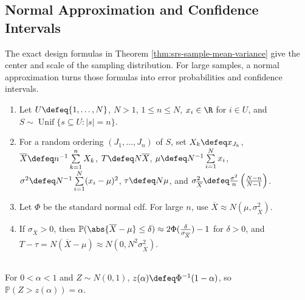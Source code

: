 \subsection{Normal Approximation and Confidence Intervals}

The exact design formulas in Theorem \ref{thm:srs-sample-mean-variance} give the center and scale of the sampling distribution.  For large samples, a normal approximation turns those formulas into error probabilities and confidence intervals.

\begin{method} \label{meth:srs-normal-approximation} 
\begin{enumerate}[label=(\roman*)]
\setlength{\itemsep}{0pt}
\item Let $U\defeq\{1,\ldots,N\}$, $N>1$, $1\leq n\leq N$, $x_i\in\R$ for $i\in U$, and $S\sim\operatorname{Unif}\{s\subseteq U:|s|=n\}$.
\item For a random ordering $(J_1,\ldots,J_n)$ of $S$, set $X_k\defeq x_{J_k}$, $\overline{X}\defeq n^{-1}\sum\limits_{k=1}^{n}X_k$, $T\defeq N\overline{X}$, $\mu\defeq N^{-1}\sum\limits_{i=1}^{N}x_i$, $\sigma^2\defeq N^{-1}\sum\limits_{i=1}^{N}(x_i-\mu)^2$, $\tau\defeq N\mu$, and $\sigma_{\overline{X}}^2\defeq\frac{\sigma^2}{n}\left(\frac{N-n}{N-1}\right)$.
\item Let $\Phi$ be the standard normal cdf. For large $n$, use $\overline{X}\approx N(\mu,\sigma_{\overline{X}}^2)$.
\item If $\sigma_{\overline{X}}>0$, then $\mathbb{P}(\abs{\overline{X}-\mu}\leq\delta)\approx2\Phi(\frac{\delta}{\sigma_{\overline{X}}})-1$ for $\delta>0$, and $T-\tau=N(\overline{X}-\mu)\approx N(0,N^2\sigma_{\overline{X}}^2)$.
\end{enumerate}
\end{method}

\begin{definition} \label{def:normal-right-tail-quantile} \\
For $0<\alpha<1$ and $Z\sim N(0,1)$, $z(\alpha)\defeq\Phi^{-1}(1-\alpha)$, so $\mathbb{P}(Z>z(\alpha))=\alpha$.
\end{definition}

